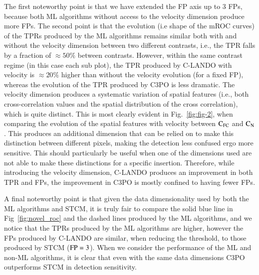 \documentclass{aa}
\begin{document}
The first noteworthy point is that we have extended the FP axis up to $3$ FPs, because both ML algorithms without access to the velocity dimension produce more FPs.
The second point is that the evolution (i.e shape of the mROC curves) of the TPRs produced by the ML algorithms remains similar both with and without the velocity dimension between two different contrasts, i.e., the TPR falls by a fraction of $\approx 50\%$ between contrasts.
However, within the same contrast regime (in this case each sub plot), the TPR produced by C-LANDO with velocity is $\approx 20\%$ higher than without the velocity evolution (for a fixed FP), whereas the evolution of the TPR produced by C3PO is less dramatic.
The velocity dimension produces a systematic variation of spatial features (i.e., both cross-correlation values and the spatial distribution of the cross correlation), which is quite distinct.
This is most clearly evident in Fig.~\ref{fig:fig-2}, when comparing the evolution of the spatial features with velocity between $\rm{C_{FC}}$ and $\rm{C_N}$.
This produces an additional dimension that can be relied on to make this distinction between different pixels, making the detection less confused ergo more sensitive.
This should particularly be useful when one of the dimensions used are not able to make these distinctions for a specific insertion.
Therefore, while introducing the velocity dimension, C-LANDO produces an improvement in both TPR and FPs, the improvement in C3PO is mostly confined to having fewer FPs.

A final noteworthy point is that given the data dimensionality used by both the ML algorithms and STCM, it is truly fair to compare the solid blue line in Fig~\ref{fig:novel_roc} and the dashed lines produced by the ML algorithms, and we notice that the TPRs produced by the ML algorithms are higher, however the FPs produced by C-LANDO are similar, when reducing the threshold, to those produced by STCM (${\rm FP}=3$). 
When we consider the performance of the ML and non-ML algorithms, it is clear that even with the same data dimensions C3PO outperforms STCM in detection sensitivity.
\end{document}

